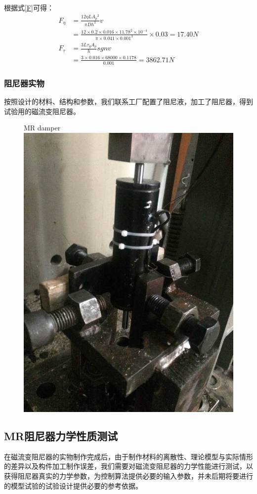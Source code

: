 根据式\eqref{F}可得：
\begin{equation}
\begin{split}
F_\eta&=\frac{12\eta LA{_p}{^2}}{\pi Dh^3}v\\&=\frac{12\times0.2\times0.016\times11.78^2\times10^{-4}}{\pi\times0.041\times0.001^3}\times0.03=17.40N
\\
F_{\tau}&=\frac{3L\tau_yA_p}{h}sgnv\\&=\frac{3\times0.016\times68000\times0.1178}{0.001}=3862.71N
\end{split}
\end{equation}

\subsubsection{阻尼器实物}
按照设计的材料、结构和参数，我们联系工厂配置了阻尼液，加工了阻尼器，得到试验用的磁流变阻尼器。

\begin{figure}[H]
	\centering
		{MR damper}
	\label{shiwu}
	\includegraphics[width=.5\linewidth]{figure/shiwu}
\end{figure}

\subsection{MR阻尼器力学性质测试}

在磁流变阻尼器的实物制作完成后，由于制作材料的离散性、理论模型与实际情形的差异以及构件加工制作误差，我们需要对磁流变阻尼器的力学性能进行测试，以获得阻尼器真实的力学参数，为控制算法提供必要的输入参数，并未后期将要进行的模型试验的试验设计提供必要的参考依据。

